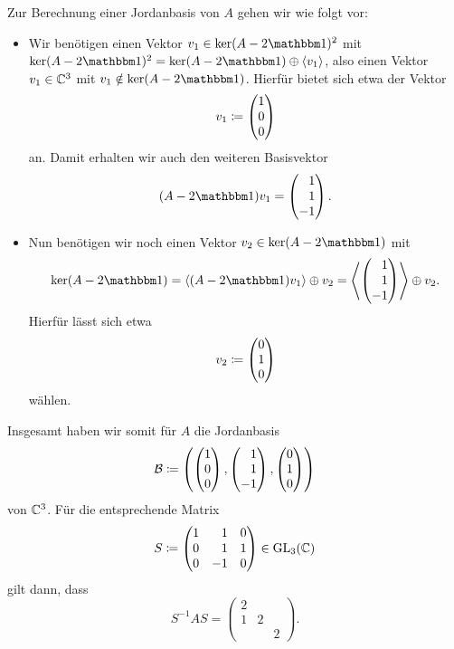 \begin{example}
  
  Zur Berechnung einer Jordanbasis von $A$ gehen wir wie folgt vor:
  \begin{itemize}
    \item
      Wir benötigen einen Vektor $v_1 \in \ker (A - 2 \Id)^2$ mit $\ker (A - 2 \Id)^2 = \ker (A - 2 \Id) \oplus \generated{v_1}$, also einen Vektor $v_1 \in \mathbb{C}^3$ mit $v_1 \notin \ker (A - 2 \Id)$.
      Hierfür bietet sich etwa der Vektor
      \[
                  v_1
        \coloneqq \begin{pmatrix} 1 \\ 0 \\ 0 \end{pmatrix}
      \]
      an.
      Damit erhalten wir auch den weiteren Basisvektor
      \[
          (A - 2 \Id) v_1
        = \rvect{1 \\ 1 \\ -1}.
      \]
    \item
      Nun benötigen wir noch einen Vektor $v_2 \in \ker (A - 2 \Id)$ mit
      \[
          \ker (A - 2 \Id)
        = \generated{(A - 2 \Id) v_1} \oplus v_2
        = \generated{ \rvect{1 \\ 1 \\ -1} } \oplus v_2.
      \]
      Hierfür lässt sich etwa
      \[
                  v_2
        \coloneqq \begin{pmatrix} 0 \\ 1 \\ 0 \end{pmatrix}
      \]
      wählen.
  \end{itemize}
  Insgesamt haben wir somit für $A$ die Jordanbasis
  \[
              \basis{B}
    \coloneqq \left(
                \vect{1 \\ 0 \\ 0},
                \rvect{1 \\ 1 \\ -1},
                \vect{0 \\ 1 \\ 0}
              \right)
  \]
  von $\mathbb{C}^3$.
  Für die entsprechende Matrix
  \[
              S
    \coloneqq \begin{pmatrix*}[r]
                1 &  1  & 0 \\
                0 &  1  & 1 \\
                0 & -1  & 0
              \end{pmatrix*}
    \in \GL{3}{\Complex}
  \]
  gilt dann, dass
  \[
      S^{-1} A S
    = \begin{pmatrix}
        2 &   &   \\
        1 & 2 &   \\
          &   & 2
      \end{pmatrix}.
  \]
\end{example}

